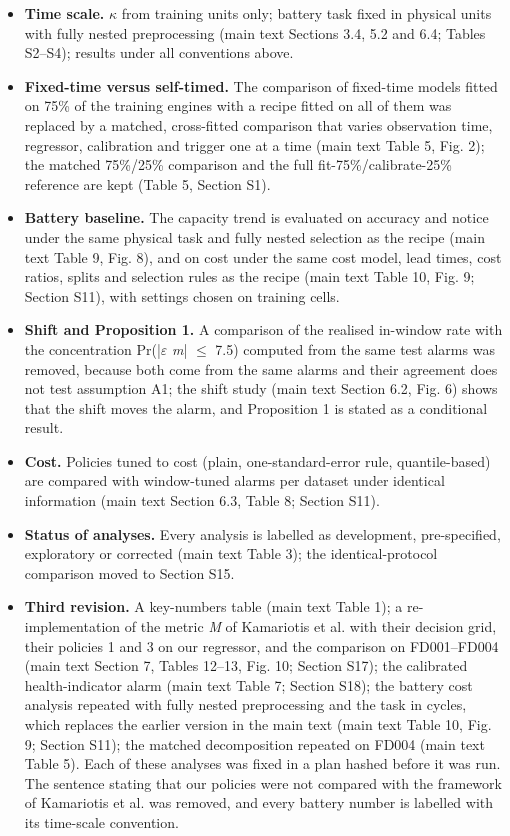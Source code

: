 \documentclass[11pt,a4paper]{article}
\begin{document}
\begin{itemize}[leftmargin=1.2em,itemsep=2pt]
\item \textbf{Time scale.} $\kappa$ from training units only; battery task fixed in physical units with fully nested preprocessing (main text Sections 3.4, 5.2 and 6.4; Tables S2--S4); results under all conventions above.
\item \textbf{Fixed-time versus self-timed.} The comparison of fixed-time models fitted on 75\% of the training engines with a recipe fitted on all of them was replaced by a matched, cross-fitted comparison that varies observation time, regressor, calibration and trigger one at a time (main text Table 5, Fig. 2); the matched 75\%/25\% comparison and the full fit-75\%/calibrate-25\% reference are kept (Table 5, Section S1).
\item \textbf{Battery baseline.} The capacity trend is evaluated on accuracy and notice under the same physical task and fully nested selection as the recipe (main text Table 9, Fig. 8), and on cost under the same cost model, lead times, cost ratios, splits and selection rules as the recipe (main text Table 10, Fig. 9; Section S11), with settings chosen on training cells.
\item \textbf{Shift and Proposition 1.} A comparison of the realised in-window rate with the concentration Pr(|$\varepsilon$ \textminus{} \textit{m}| $\le$ 7.5) computed from the same test alarms was removed, because both come from the same alarms and their agreement does not test assumption A1; the shift study (main text Section 6.2, Fig. 6) shows that the shift moves the alarm, and Proposition 1 is stated as a conditional result.
\item \textbf{Cost.} Policies tuned to cost (plain, one-standard-error rule, quantile-based) are compared with window-tuned alarms per dataset under identical information (main text Section 6.3, Table 8; Section S11).
\item \textbf{Status of analyses.} Every analysis is labelled as development, pre-specified, exploratory or corrected (main text Table 3); the identical-protocol comparison moved to Section S15.
\item \textbf{Third revision.} A key-numbers table (main text Table 1); a re-implementation of the metric \textit{M} of Kamariotis et al. with their decision grid, their policies 1 and 3 on our regressor, and the comparison on FD001--FD004 (main text Section 7, Tables 12--13, Fig. 10; Section S17); the calibrated health-indicator alarm (main text Table 7; Section S18); the battery cost analysis repeated with fully nested preprocessing and the task in cycles, which replaces the earlier version in the main text (main text Table 10, Fig. 9; Section S11); the matched decomposition repeated on FD004 (main text Table 5). Each of these analyses was fixed in a plan hashed before it was run. The sentence stating that our policies were not compared with the framework of Kamariotis et al. was removed, and every battery number is labelled with its time-scale convention.
\end{itemize}
\end{document}
